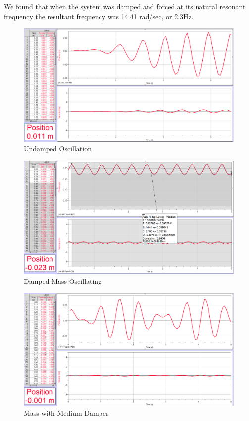\documentclass[]{article}
\begin{document}
We found that when the system was damped and forced at its natural resonant frequency the resultant frequency was 14.41 rad/sec, or 2.3Hz.



\begin{figure}[H]
	\centering
	\includegraphics[width=\textwidth]{res/forced_undamped}
	\caption{Undamped Oscillation}
	\label{fig:Undamped Oscillation}
\end{figure}

\begin{figure}[H]
	\centering
	\includegraphics[width=\textwidth]{res/Damped}
	\caption{Damped Mass Oscillating}
	\label{fig:Damped Mass Oscillating}
\end{figure}


\begin{figure}[H]
	\centering
	\includegraphics[width=\textwidth]{res/part3_1point5_hz}
	\caption{Mass with Medium Damper}
	\label{fig:Mass with Medium Damper}
\end{figure}
\end{document}
